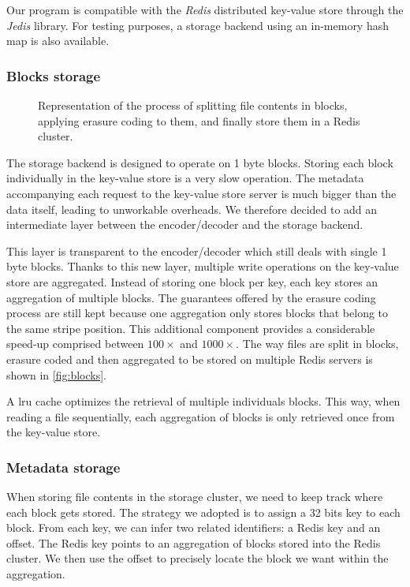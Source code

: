 Our program is compatible with the \textit{Redis} distributed key-value store through the \textit{Jedis} library.
For testing purposes, a storage backend using an in-memory hash map is also available.

\subsubsection{Blocks storage}

\begin{figure}[H]
    \centering
    
    \caption{Representation of the process of splitting file contents in blocks, applying erasure coding to them, and finally store them in a Redis cluster.}
    \label{fig:blocks}
\end{figure}

The storage backend is designed to operate on 1 byte blocks.
Storing each block individually in the key-value store is a very slow operation.
The metadata accompanying each request to the key-value store server is much bigger than the data itself, leading to unworkable overheads.
We therefore decided to add an intermediate layer between the encoder/decoder and the storage backend.

This layer is transparent to the encoder/decoder which still deals with single 1 byte blocks.
Thanks to this new layer, multiple write operations on the key-value store are aggregated.
Instead of storing one block per key, each key stores an aggregation of multiple blocks.
The guarantees offered by the erasure coding process are still kept because one aggregation only stores blocks that belong to the same stripe position.
This additional component provides a considerable speed-up comprised between $100\times$ and $1000\times$.
The way files are split in blocks, erasure coded and then aggregated to be stored on multiple Redis servers is shown in \autoref{fig:blocks}.

A \ac{lru} cache optimizes the retrieval of multiple individuals blocks.
This way, when reading a file sequentially, each aggregation of blocks is only retrieved once from the key-value store.

\subsubsection{Metadata storage}

When storing file contents in the storage cluster, we need to keep track where each block gets stored.
The strategy we adopted is to assign a 32 bits key to each block.
From each key, we can infer two related identifiers: a Redis key and an offset.
The Redis key points to an aggregation of blocks stored into the Redis cluster.
We then use the offset to precisely locate the block we want within the aggregation.

